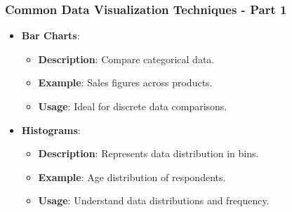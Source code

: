 \documentclass[aspectratio=169]{beamer}
\begin{document}
\begin{frame}[fragile]
    \frametitle{Common Data Visualization Techniques - Part 1}
    \begin{itemize}
        \item \textbf{Bar Charts}:
        \begin{itemize}
            \item \textbf{Description}: Compare categorical data.
            \item \textbf{Example}: Sales figures across products.
            \item \textbf{Usage}: Ideal for discrete data comparisons.
        \end{itemize}
        
        \item \textbf{Histograms}:
        \begin{itemize}
            \item \textbf{Description}: Represents data distribution in bins.
            \item \textbf{Example}: Age distribution of respondents.
            \item \textbf{Usage}: Understand data distributions and frequency.
        \end{itemize}
    \end{itemize}
\end{frame}
\end{document}
